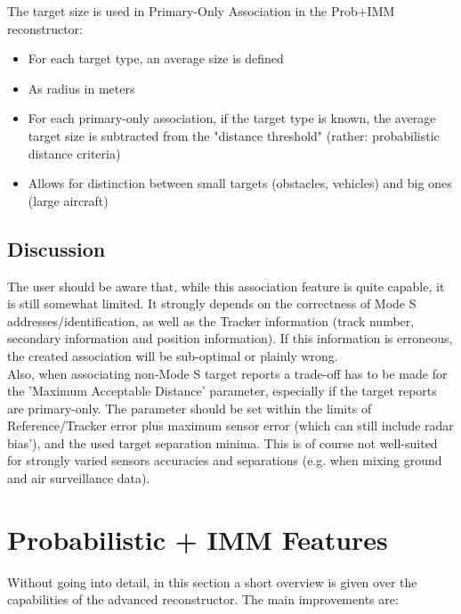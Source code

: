 \begin{itemize}
The target size is used in Primary-Only Association in the Prob+IMM reconstructor:

\begin{itemize}
\item For each target type, an average size is defined
\item As radius in meters
\item For each primary-only association, if the target type is known, the average target size is subtracted from the "distance threshold" (rather: probabilistic distance criteria)
\item Allows for distinction between small targets (obstacles, vehicles) and big ones (large aircraft)
\end{itemize}

\subsection{Discussion}

The user should be aware that, while this association feature is quite capable, it is still somewhat limited. 
It strongly depends on the correctness of Mode S addresses/identification, as well as the Tracker information (track number, secondary information and position information). 
If this information is erroneous, the created association will be sub-optimal or plainly wrong. \\

Also, when associating non-Mode S target reports a trade-off has to be made for the 'Maximum Acceptable Distance' parameter, 
especially if the target reports are primary-only. The parameter should be set within the limits of Reference/Tracker error plus maximum sensor error (which can still include radar bias'), and the used target separation minima. 
This is of course not well-suited for strongly varied sensors accuracies and separations (e.g. when mixing ground and air surveillance data). \\

\section{Probabilistic + IMM Features}

Without going into detail, in this section a short overview is given over the capabilities of the advanced reconstructor. The main improvements are:


\end{itemize}
